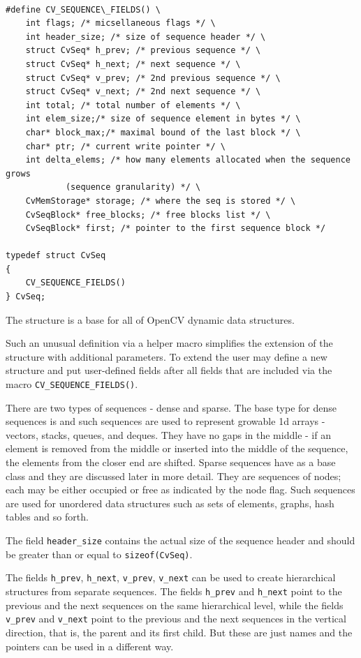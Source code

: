 \ifC
\begin{lstlisting}

#define CV_SEQUENCE\_FIELDS() \
    int flags; /* micsellaneous flags */ \
    int header_size; /* size of sequence header */ \
    struct CvSeq* h_prev; /* previous sequence */ \
    struct CvSeq* h_next; /* next sequence */ \
    struct CvSeq* v_prev; /* 2nd previous sequence */ \
    struct CvSeq* v_next; /* 2nd next sequence */ \
    int total; /* total number of elements */ \
    int elem_size;/* size of sequence element in bytes */ \
    char* block_max;/* maximal bound of the last block */ \
    char* ptr; /* current write pointer */ \
    int delta_elems; /* how many elements allocated when the sequence grows 
			(sequence granularity) */ \
    CvMemStorage* storage; /* where the seq is stored */ \
    CvSeqBlock* free_blocks; /* free blocks list */ \
    CvSeqBlock* first; /* pointer to the first sequence block */

typedef struct CvSeq
{
    CV_SEQUENCE_FIELDS()
} CvSeq;

\end{lstlisting}

The structure  is a base for all of OpenCV dynamic data structures.

Such an unusual definition via a helper macro simplifies the extension
of the structure \cross{CvSeq} with additional parameters. To extend
\cross{CvSeq} the user may define a new structure and put user-defined
fields after all \cross{CvSeq} fields that are included via the macro
\texttt{CV\_SEQUENCE\_FIELDS()}.

There are two types of sequences - dense and sparse. The base type for dense
sequences is \cross{CvSeq} and such sequences are used to represent
growable 1d arrays - vectors, stacks, queues, and deques. They have no gaps
in the middle - if an element is removed from the middle or inserted
into the middle of the sequence, the elements from the closer end are
shifted. Sparse sequences have  as a base class and they are
discussed later in more detail. They are sequences of nodes; each may be either occupied or free as indicated by the node flag. Such
sequences are used for unordered data structures such as sets of elements,
graphs, hash tables and so forth.

The field \texttt{header\_size} contains the actual size of the sequence
header and should be greater than or equal to \texttt{sizeof(CvSeq)}.

The fields
\texttt{h\_prev}, \texttt{h\_next}, \texttt{v\_prev}, \texttt{v\_next}
can be used to create hierarchical structures from separate sequences. The
fields \texttt{h\_prev} and \texttt{h\_next} point to the previous and
the next sequences on the same hierarchical level, while the fields
\texttt{v\_prev} and \texttt{v\_next} point to the previous and the
next sequences in the vertical direction, that is, the parent and its first
child. But these are just names and the pointers can be used in a
different way.

